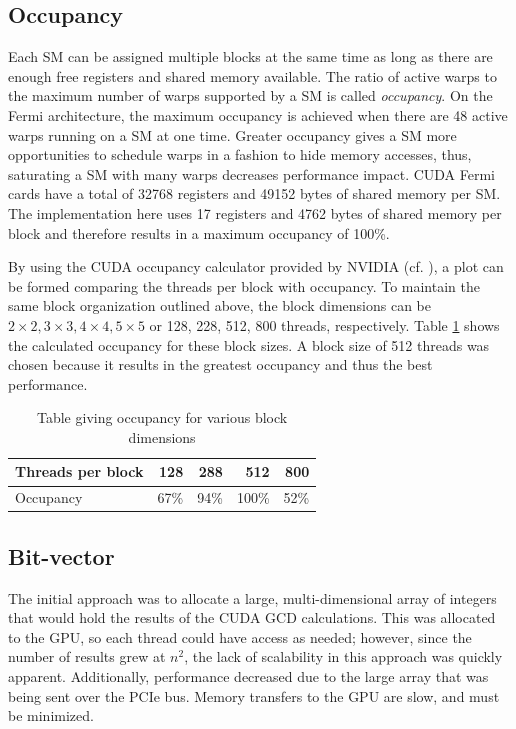 \documentclass[12pt]{ucthesis}
\begin{document}
\subsection{Occupancy}
\label{sec:occupancy}
Each SM can be assigned multiple blocks at the same time as long as there are 
enough free registers and shared memory available. The ratio of active warps 
to the maximum number of warps supported by a SM is called \emph{occupancy}. 
On the Fermi architecture, the maximum occupancy is achieved when there are 48 
active warps running on a SM at one time. Greater occupancy gives a SM more
opportunities to schedule warps in a fashion to hide memory accesses, thus,
saturating a SM with many warps decreases performance impact. CUDA Fermi cards
have a total of 32768 registers and 49152 bytes of shared memory per SM. The
implementation here uses 17 registers and 4762 bytes of shared memory per
block and therefore results in a maximum occupancy of 100\%.

By using the CUDA occupancy calculator provided by NVIDIA (cf. 
\cite{nvidia2012gpu}), a plot can be formed comparing the threads per block 
with occupancy. To maintain the same block organization outlined above, the 
block dimensions can be $2\times2, 3\times3, 4\times4, 5\times5$ or 128, 228, 
512, 800 threads, respectively. Table \ref{tab:occupancy} shows the calculated 
occupancy for these block sizes. A block size of 512 threads was chosen 
because it results in the greatest occupancy and thus the best performance. 

\begin{table}
   \label{tab:occupancy}
   \centering
   \begin{tabular}{l|rrrr}
      Threads per block & 128 & 288 & 512 & 800\\
      \hline
              Occupancy & 67\% & 94\% & 100\% & 52\%\\
   \end{tabular}
   \caption{Table giving occupancy for various block dimensions}
\end{table}

\subsection{Bit-vector}
\label{subsec:bitvector}
The initial approach was to allocate a large, multi-dimensional array of 
integers that would hold the results of the CUDA GCD calculations. This was 
allocated to the GPU, so each thread could have access as needed; however, 
since the number of results grew at $n^2$, the lack of scalability in this 
approach was quickly apparent. Additionally, performance decreased due to the 
large array that was being sent over the PCIe bus. Memory transfers to 
the GPU are slow, and must be minimized.
\end{document}
